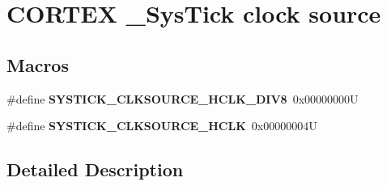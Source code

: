 \hypertarget{group___c_o_r_t_e_x___sys_tick__clock__source}{}\section{C\+O\+R\+T\+EX \+\_\+\+Sys\+Tick clock source}
\label{group___c_o_r_t_e_x___sys_tick__clock__source}
\subsection*{Macros}
\begin{DoxyCompactItemize}
\item 
\mbox{\label{group___c_o_r_t_e_x___sys_tick__clock__source_ga1fd9b5bada2a8b2425a8523bc0fc7124}} 
\#define {\bfseries S\+Y\+S\+T\+I\+C\+K\+\_\+\+C\+L\+K\+S\+O\+U\+R\+C\+E\+\_\+\+H\+C\+L\+K\+\_\+\+D\+I\+V8}~0x00000000U
\item 
\mbox{\label{group___c_o_r_t_e_x___sys_tick__clock__source_ga6f6582df23b6fbc578325e453b9893b7}} 
\#define {\bfseries S\+Y\+S\+T\+I\+C\+K\+\_\+\+C\+L\+K\+S\+O\+U\+R\+C\+E\+\_\+\+H\+C\+LK}~0x00000004U
\end{DoxyCompactItemize}


\subsection{Detailed Description}

